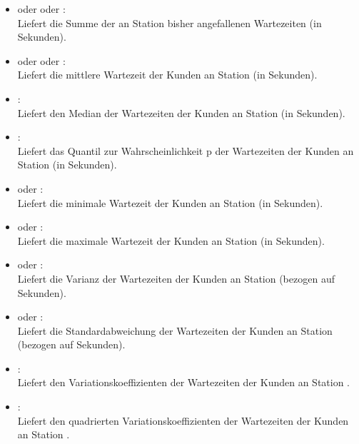 \begin{itemize}

\item {} oder  oder :\\
Liefert die Summe der an Station  bisher angefallenen Wartezeiten (in Sekunden).

\item
{} oder  oder :\\
Liefert die mittlere Wartezeit der Kunden an Station  (in Sekunden).

\item
{}:\\
Liefert den Median der Wartezeiten der Kunden an Station  (in Sekunden).

\item
{}:\\
Liefert das Quantil zur Wahrscheinlichkeit p der Wartezeiten der Kunden an Station  (in Sekunden).

\item
{} oder :\\  
Liefert die minimale Wartezeit der Kunden an Station  (in Sekunden).

\item
{} oder :\\
Liefert die maximale Wartezeit der Kunden an Station  (in Sekunden).

\item
{} oder :\\
Liefert die Varianz der Wartezeiten der Kunden an Station  (bezogen auf Sekunden).

\item
{} oder :\\
Liefert die Standardabweichung der Wartezeiten der Kunden an Station  (bezogen auf Sekunden).

\item
{}:\\
Liefert den Variationskoeffizienten der Wartezeiten der Kunden an Station .

\item
{}:\\
Liefert den quadrierten Variationskoeffizienten der Wartezeiten der Kunden an Station .


\end{itemize}
